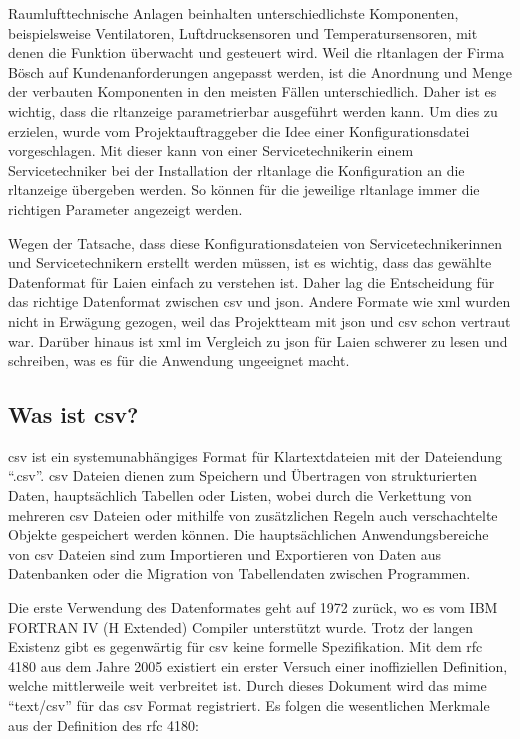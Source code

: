 Raumlufttechnische Anlagen beinhalten unterschiedlichste Komponenten, beispielsweise Ventilatoren, Luftdrucksensoren und Temperatursensoren, mit denen die Funktion überwacht und gesteuert wird. Weil die \acs{rltanlagen} der Firma Bösch auf Kundenanforderungen angepasst werden, ist die Anordnung und Menge der verbauten Komponenten in den meisten Fällen unterschiedlich. Daher ist es wichtig, dass die \acs{rltanzeige} parametrierbar ausgeführt werden kann. Um dies zu erzielen, wurde vom Projektauftraggeber die Idee einer Konfigurationsdatei vorgeschlagen. Mit dieser kann von einer  Servicetechnikerin \bzw einem Servicetechniker bei der Installation der \acs{rltanlage} die Konfiguration an die \acs{rltanzeige} übergeben werden. So können für die jeweilige \acs{rltanlage} immer die richtigen Parameter angezeigt werden.

Wegen der Tatsache, dass diese Konfigurationsdateien von Servicetechnikerinnen und Servicetechnikern erstellt werden müssen, ist es wichtig, dass das gewählte Datenformat für Laien einfach zu verstehen ist. Daher lag die Entscheidung für das richtige Datenformat zwischen \acs{csv} und \acs{json}. Andere Formate  wie \acf{xml} wurden nicht in Erwägung gezogen, weil das Projektteam mit \acs{json} und \acs{csv} schon vertraut war. Darüber hinaus ist \acs{xml} im Vergleich zu \acs{json} für Laien schwerer zu lesen und schreiben, was es für die Anwendung ungeeignet macht. 

\subsection{Was ist \acs{csv}?}
\acf{csv} ist ein systemunabhängiges Format für Klartextdateien mit der Dateiendung \enquote{.csv}. \acs{csv} Dateien dienen zum Speichern und Übertragen von strukturierten Daten, hauptsächlich Tabellen oder Listen, wobei durch die Verkettung von mehreren \acs{csv} Dateien oder mithilfe von zusätzlichen Regeln auch verschachtelte Objekte gespeichert werden können. Die hauptsächlichen Anwendungsbereiche von \acs{csv} Dateien sind zum Importieren und Exportieren von Daten aus Datenbanken oder die Migration von Tabellendaten zwischen Programmen. \cite[vgl.][]{FuchsMediaSolutions:o.J.}

Die erste Verwendung des Datenformates geht auf 1972 zurück, wo es vom IBM FORTRAN IV (H Extended) Compiler unterstützt wurde. \cite[vgl.][]{IBM:1972} Trotz der langen Existenz gibt es gegenwärtig für \acs{csv} keine formelle Spezifikation. Mit dem \acs{rfc} 4180 \cite[vgl.][]{Shafranovich:2005} aus dem Jahre 2005 existiert ein erster Versuch einer inoffiziellen Definition, welche mittlerweile weit verbreitet ist. Durch dieses Dokument wird das \acf{mime} \enquote{text/csv} für das \acs{csv} Format registriert. Es folgen die wesentlichen Merkmale aus der Definition des \acs{rfc} 4180:

